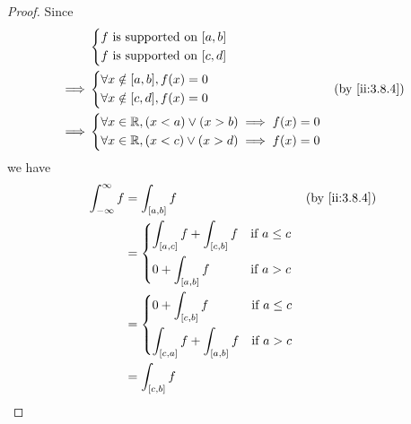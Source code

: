 \begin{proof}
  Since
  \begin{align*}
             & \begin{dcases}
                 f \text{ is supported on } [a, b] \\
                 f \text{ is supported on } [c, d]
               \end{dcases}                        \\
    \implies & \begin{dcases}
                 \forall x \notin [a, b], f(x) = 0 \\
                 \forall x \notin [c, d], f(x) = 0
               \end{dcases}                        &  & \by{ii:3.8.4}   \\
    \implies & \begin{dcases}
                 \forall x \in \R, (x < a) \lor (x > b) \implies f(x) = 0 \\
                 \forall x \in \R, (x < c) \lor (x > d) \implies f(x) = 0
               \end{dcases}
  \end{align*}
  we have
  \begin{align*}
    \int_{-\infty}^\infty f & = \int_{[a, b]} f                                                                                                            &  & \by{ii:3.8.4} \\
                            & = \begin{dcases}
                                  \int_{[a, c]} f + \int_{[c, b]} f & \text{if } a \leq c \\
                                  0 + \int_{[a, b]} f               & \text{if } a > c
                                \end{dcases}                     \\
                            & = \begin{dcases}
                                  0 + \int_{[c, b]} f               & \text{if } a \leq c \\
                                  \int_{[c, a]} f + \int_{[a, b]} f & \text{if } a > c
                                \end{dcases}                     \\
                            & = \int_{[c, b]} f                                                                                                                               \\

\end{align*}
\end{proof}
